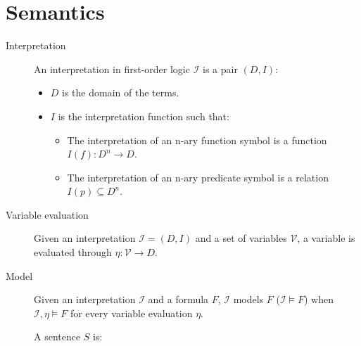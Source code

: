 \section{Semantics}

\begin{description}
    \item[Interpretation] 
        An interpretation in first-order logic $\mathcal{I}$ is a pair $(D, I)$:
        \begin{itemize}
            \item $D$ is the domain of the terms.
            \item $I$ is the interpretation function such that:
            \begin{itemize}
                \item The interpretation of an n-ary function symbol is a function $I(f): D^n \rightarrow D$.
                \item The interpretation of an n-ary predicate symbol is a relation $I(p) \subseteq D^n$.
            \end{itemize}
        \end{itemize}

    \item[Variable evaluation] 
        Given an interpretation $\mathcal{I} = (D, I)$ and a set of variables $\mathcal{V}$,
        a variable is evaluated through $\eta: \mathcal{V} \rightarrow D$.

    \item[Model] 
        Given an interpretation $\mathcal{I}$ and a formula $F$,
        $\mathcal{I}$ models $F$ ($\mathcal{I} \models F$) 
        when $\mathcal{I}, \eta \models F$ for every variable evaluation $\eta$.

        A sentence $S$ is:


\end{description}

